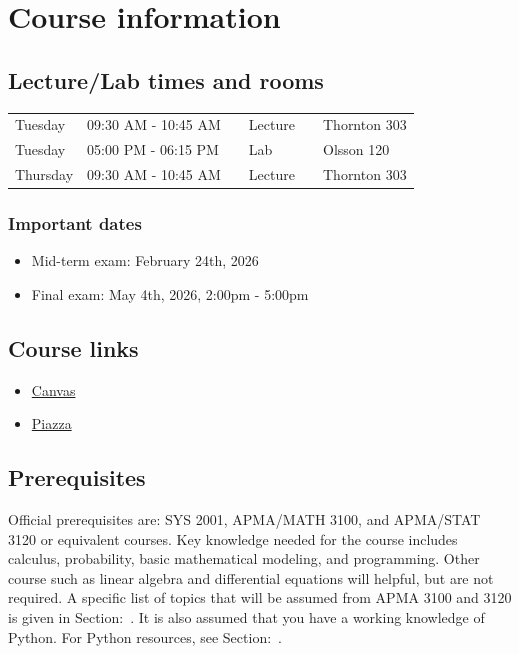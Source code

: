 \documentclass[11pt, a4paper]{article}
\begin{document}

\section*{Course information}

\subsection*{\textbf{Lecture/Lab times and rooms}}

\phantom{}\begin{tabular}{llllll}
Tuesday &  09:30 AM - 10:45 AM && Lecture && Thornton 303\\
Tuesday &  05:00 PM - 06:15 PM && Lab     && Olsson 120  \\
Thursday & 09:30 AM - 10:45 AM && Lecture && Thornton 303
\end{tabular}

\subsubsection*{Important dates}

\begin{itemize}
\item Mid-term exam: February 24th, 2026
\item Final exam: May 4th, 2026, 2:00pm - 5:00pm
\end{itemize}

\subsection*{\textbf{Course links}}
\begin{itemize}
\item \href{https://canvas.its.virginia.edu/courses/167534}{Canvas}
\item \href{https://piazza.com/class/tbd}{Piazza}
\end{itemize}


\subsection*{Prerequisites}
Official prerequisites are: SYS 2001, APMA/MATH 3100, and APMA/STAT 3120 or equivalent courses. Key knowledge needed for the course includes calculus, probability, basic mathematical modeling, and programming. Other course such as linear algebra and differential equations will helpful, but are not required. A specific list of topics that will be assumed from APMA 3100 and 3120 is given in Section:~.
It is also assumed that you have a working knowledge of Python. For Python resources, see Section:~. 
\end{document}
